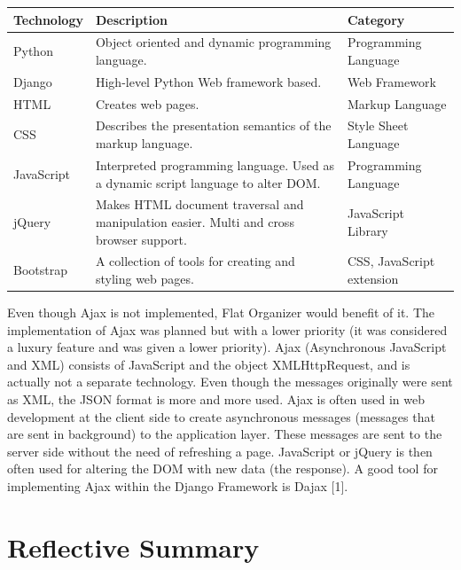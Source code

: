 \documentclass{sig-alt-release2}
\begin{document}
\begin{center}
    \begin{tabular}{ | p{1.7cm} | p{3.5cm} | p{2cm} |}
    \hline
	 \textbf{Technology} & \textbf{Description} & \textbf{Category} \\ \hline
	
	Python & Object oriented and dynamic programming language. &	Programming Language \\ \hline
	Django & High-level Python Web framework based.&	Web Framework \\ \hline
	HTML & Creates web pages.	&Markup Language \\ \hline
	CSS	& Describes the presentation semantics of the markup language.&	Style Sheet Language \\ \hline
	JavaScript & Interpreted programming language. Used as a dynamic script language to alter DOM. & Programming Language \\ \hline
	jQuery & Makes HTML document traversal and manipulation easier. Multi and cross browser support. &	JavaScript Library \\ \hline
	Bootstrap & A collection of tools for creating and styling web pages. & CSS, JavaScript extension \\
	
    \hline
    \end{tabular}
\end{center}

Even though Ajax is not implemented, Flat Organizer would benefit of it. The
implementation of Ajax was planned but with a lower priority (it was considered
a luxury feature and was given a lower priority). Ajax (Asynchronous JavaScript
and XML) consists of JavaScript and the object XMLHttpRequest, and is actually
not a separate technology. Even though the messages originally were sent as XML,
the JSON format is more and more used. Ajax is often used in web development at
the client side to create asynchronous messages (messages that are sent in
background) to the application layer. These messages are sent to the server side
without the need of refreshing a page. JavaScript or jQuery is then often used
for altering the DOM with new data (the response). A good tool for implementing
Ajax within the Django Framework is Dajax [1].

\section{Reflective Summary}
\end{document}
